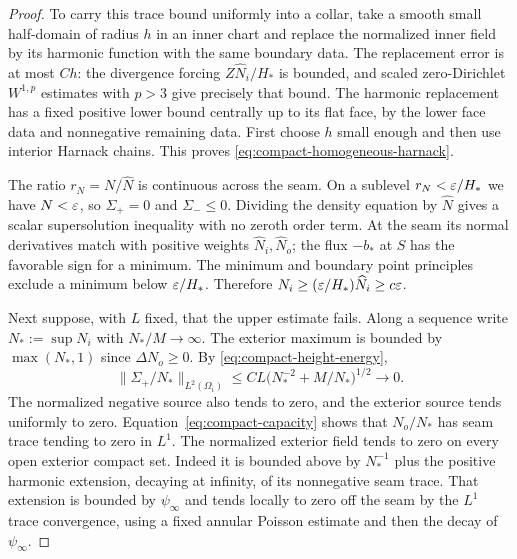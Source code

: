 \begin{proof}
To carry this trace bound uniformly into a collar, take a smooth small
half-domain of radius $h$ in an inner chart and replace the normalized
inner field by its harmonic function with the same boundary data.
The replacement error is at most $Ch$: the divergence forcing
$Z\widehat N_i/H_*$ is bounded, and scaled zero-Dirichlet
$W^{1,p}$ estimates with $p>3$ give precisely that bound. The harmonic
replacement has a fixed positive lower bound centrally up to its
flat face, by the lower face data and nonnegative remaining data.
First choose $h$ small enough and then use interior Harnack chains.
This proves \eqref{eq:compact-homogeneous-harnack}.

The ratio $r_N=N/\widehat N$ is continuous across the seam. On a
sublevel $r_N<\varepsilon/H_*$ we have $N<\varepsilon$, so $\Sigma_+=0$ and
$\Sigma_-\le0$. Dividing the density equation by $\widehat N$ gives
a scalar supersolution inequality with no zeroth order term.
At the seam its normal derivatives match with positive weights
$\widehat N_i,\widehat N_o$; the flux $-b_*$ at $S$ has the favorable
sign for a minimum. The minimum and boundary point principles exclude
a minimum below $\varepsilon/H_*$. Therefore
$N_i\ge(\varepsilon/H_*)\widehat N_i\ge c\varepsilon$.

Next suppose, with $L$ fixed, that the upper estimate fails. Along a
sequence write $N_*:=\sup N_i$ with $N_*/M\to\infty$. The exterior
maximum is bounded by $\max(N_*,1)$ since $\Delta N_o\ge0$.
By \eqref{eq:compact-height-energy},
\[
 \|\Sigma_+/N_*\|_{L^2(\Omega_i)}
 \le CL\bigl(N_*^{-2}+M/N_*\bigr)^{1/2}\longrightarrow0.
\]
The normalized negative source also tends to zero, and the exterior
source tends uniformly to zero. Equation~\eqref{eq:compact-capacity}
shows that $N_o/N_*$ has seam trace tending to zero in $L^1$.
The normalized exterior field tends to zero on every open exterior
compact set. Indeed it is bounded above by $N_*^{-1}$ plus the positive
harmonic extension, decaying at infinity, of its nonnegative seam
trace. That extension is bounded by $\psi_\infty$ and tends locally
to zero off the seam by the $L^1$ trace convergence, using a fixed
annular Poisson estimate and then the decay of $\psi_\infty$.


\end{proof}
